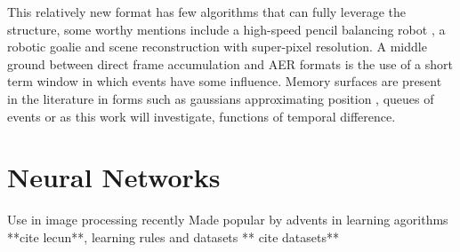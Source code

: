 This relatively new format has few algorithms that can fully leverage the structure, some worthy mentions include a high-speed pencil balancing robot \cite{conradt2009pencil}, a robotic goalie \cite{roboGoalie2013} and scene reconstruction with super-pixel resolution\cite{kim2008simultaneous}.
A middle ground between direct frame accumulation and AER formats is the use of a short term window in which events have some influence.
Memory surfaces are present in the literature in forms such as gaussians approximating position \cite{conradt2009pencil}, queues of events \cite{ni2012asynchronous} or as this work will investigate, functions of temporal difference.


% 








\section{Neural Networks}     %





Use in image processing recently
Made popular by advents in learning agorithms **cite lecun**, learning rules  \cite{Rumelhart1986} and datasets ** cite datasets**

